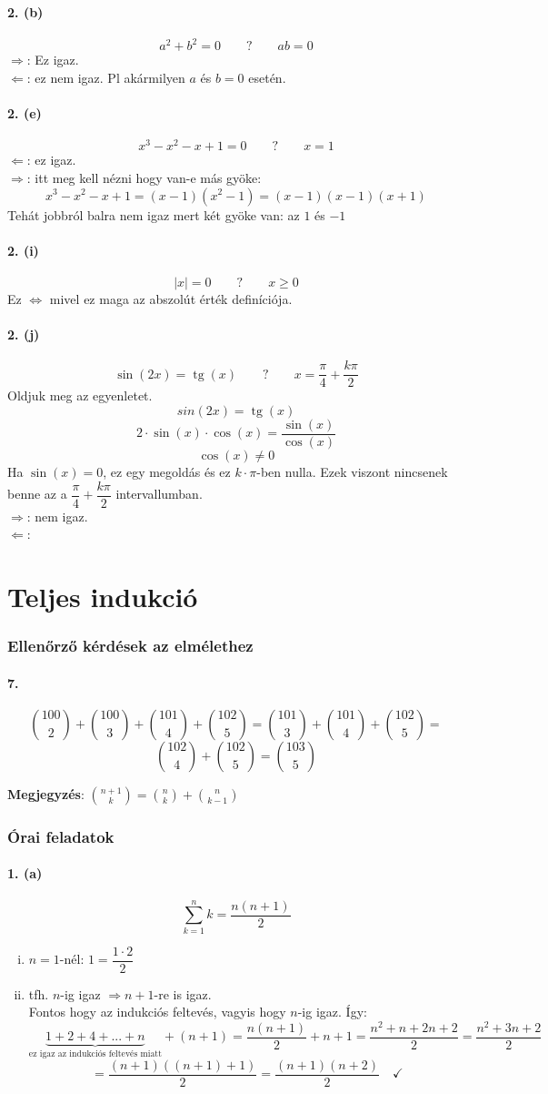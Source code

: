 \documentclass[12pt,a4paper,fleqn]{article}
\newcommand{\myparagraph}[1]{\paragraph{#1}\mbox{}}
\DeclareMathOperator{\tg}{tg}
\begin{document}
\myparagraph{2. (b)}
\[ a^2+b^2=0 \qquad ? \qquad ab=0 \]
$\Rightarrow$: Ez igaz. \\
$\Leftarrow$: ez nem igaz. Pl akármilyen $a$ és $b=0$ esetén.


\myparagraph{2. (e)}
\[ x^3 - x^2 - x + 1 = 0 \qquad ? \qquad x = 1 \]
$\Leftarrow$: ez igaz. \\
$\Rightarrow$: itt meg kell nézni hogy van-e más gyöke:
\[ x^3 - x^2 - x + 1 = (x-1)(x^2-1) = (x-1)(x-1)(x+1) \]
Tehát jobbról balra nem igaz mert két gyöke van: az $1$ és $-1$

\myparagraph{2. (i)}
\[ |x|=0 \qquad ? \qquad x \geq 0 \]
Ez $\iff$ mivel ez maga az abszolút érték definíciója.

\myparagraph{2. (j)}
\[ \sin(2x) = \tg(x) \qquad ? \qquad x = \dfrac{\pi}{4} + \dfrac{k\pi}{2} \]
Oldjuk meg az egyenletet.
\[ sin(2x) = \tg(x) \]
\[ 2 \cdot \sin(x) \cdot \cos(x) = \dfrac{\sin(x)}{\cos(x)} \]
\[ \cos(x) \neq 0 \]
Ha $\sin(x) = 0$, ez egy megoldás és ez $k \cdot \pi$-ben nulla. Ezek viszont
nincsenek benne az a $\dfrac{\pi}{4} + \dfrac{k\pi}{2}$ intervallumban. \\
$\Rightarrow$: nem igaz. \\
$\Leftarrow$:


\clearpage
\section{Teljes indukció}
\setcounter{subsection}{1}
\subsubsection{Ellenőrző kérdések az elmélethez}

\myparagraph{7.}
\[ \binom{100}{2} + \binom{100}{3} + \binom{101}{4} + \binom{102}{5} =
  \binom{101}{3} + \binom{101}{4} + \binom{102}{5} = \]
\[ \binom{102}{4} + \binom{102}{5} = \binom{103}{5} \]
\begin{flushright}
  \textbf{Megjegyzés}: $\binom{n+1}{k} = \binom{n}{k} + \binom{n}{k-1}$
\end{flushright}

\subsubsection{Órai feladatok}

\myparagraph{1. (a)}
\[ \sum_{k=1}^{n} k = \dfrac{n(n+1)}{2}\]
\begin{enumerate}[i.]
  \item $n=1$-nél: $ 1 = \dfrac{1 \cdot 2}{2} $ \checkmark
  \item tfh. $n$-ig igaz $\Rightarrow n+1$-re is igaz. \\
  Fontos hogy az indukciós feltevés, vagyis hogy $n$-ig igaz. Így:
  \[ \underbrace{1+2+4+...+n}_{\text{ez igaz az indukciós feltevés miatt}}
    + (n+1) = \dfrac{n(n+1)}{2} + n + 1 = \dfrac{n^2+n+2n+2}{2} = \dfrac{n^2+3n+2}{2} \]
  \[ = \dfrac{(n+1)((n+1) + 1)}{2} = \dfrac{(n+1)(n+2)}{2} \quad \checkmark \]
\end{enumerate}
\end{document}
